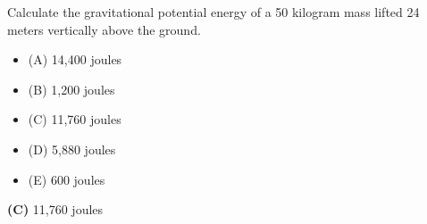 

Calculate the gravitational potential energy of a 50 kilogram mass lifted 24 meters vertically above the ground.

\begin{itemize}
\item{(A)} 14,400 joules
\vskip 5pt 
\item{(B)} 1,200 joules
\vskip 5pt 
\item{(C)} 11,760 joules
\vskip 5pt 
\item{(D)} 5,880 joules
\vskip 5pt 
\item{(E)} 600 joules
\end{itemize}







{\bf (C)} 11,760 joules
 










